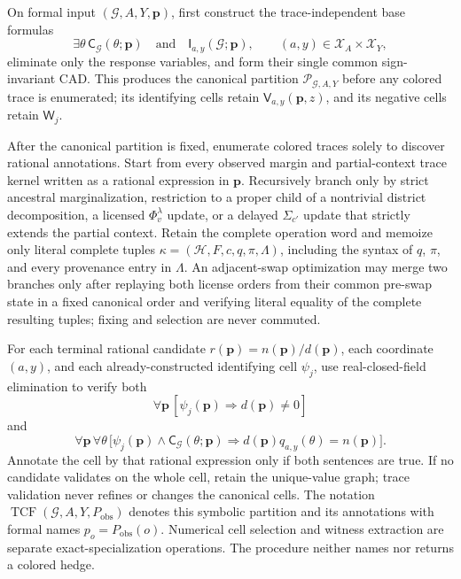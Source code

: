 On formal input \((\mathcal G,A,Y,\mathbf p)\), first construct the trace-independent base formulas
\[
\exists\theta\,\mathsf C_{\mathcal G}(\theta;\mathbf p)
\quad\text{and}\quad
\mathsf I_{a,y}(\mathcal G;\mathbf p),
\qquad (a,y)\in\mathcal X_A\times\mathcal X_Y,
\]
eliminate only the response variables, and form their single common sign-invariant CAD. This produces the canonical partition \(\mathscr P_{\mathcal G,A,Y}\) before any colored trace is enumerated; its identifying cells retain \(\mathsf V_{a,y}(\mathbf p,z)\), and its negative cells retain \(\mathsf W_j\).

After the canonical partition is fixed, enumerate colored traces solely to discover rational annotations. Start from every observed margin and partial-context trace kernel written as a rational expression in \(\mathbf p\). Recursively branch only by strict ancestral marginalization, restriction to a proper child of a nontrivial district decomposition, a licensed \(\Phi_v^{\lambda}\) update, or a delayed \(\Sigma_{c'}\) update that strictly extends the partial context. Retain the complete operation word and memoize only literal complete tuples \(\kappa=(\mathcal H,F,c,q,\pi,\Lambda)\), including the syntax of \(q\), \(\pi\), and every provenance entry in \(\Lambda\). An adjacent-swap optimization may merge two branches only after replaying both license orders from their common pre-swap state in a fixed canonical order and verifying literal equality of the complete resulting tuples; fixing and selection are never commuted.

For each terminal rational candidate \(r(\mathbf p)=n(\mathbf p)/d(\mathbf p)\), each coordinate \((a,y)\), and each already-constructed identifying cell \(\psi_j\), use real-closed-field elimination to verify both
\[
\forall\mathbf p\,[\psi_j(\mathbf p)\Rightarrow d(\mathbf p)\neq0]
\]
and
\[
\forall\mathbf p\,\forall\theta\,
\bigl[\psi_j(\mathbf p)\wedge\mathsf C_{\mathcal G}(\theta;\mathbf p)
\Rightarrow d(\mathbf p)q_{a,y}(\theta)=n(\mathbf p)\bigr].
\]
Annotate the cell by that rational expression only if both sentences are true. If no candidate validates on the whole cell, retain the unique-value graph; trace validation never refines or changes the canonical cells. The notation \(\operatorname{TCF}(\mathcal G,A,Y,P_{\mathrm{obs}})\) denotes this symbolic partition and its annotations with formal names \(p_o=P_{\mathrm{obs}}(o)\). Numerical cell selection and witness extraction are separate exact-specialization operations. The procedure neither names nor returns a colored hedge.